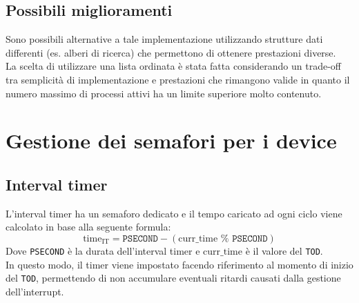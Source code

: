 \documentclass[11pt]{article}
\begin{document}
\subsection{Possibili miglioramenti}
Sono possibili alternative a tale implementazione utilizzando strutture dati differenti (es. alberi di ricerca) che permettono di ottenere prestazioni diverse. \\
La scelta di utilizzare una lista ordinata è stata fatta considerando un trade-off tra semplicità di implementazione e prestazioni che rimangono valide in quanto il numero massimo di processi attivi ha un limite superiore molto contenuto.

\newpage
\section{Gestione dei semafori per i device}
\subsection{Interval timer}
L'interval timer ha un semaforo dedicato e il tempo caricato ad ogni ciclo viene calcolato in base alla seguente formula:
\begin{equation}
    \text{time}_{\text{IT}} = \texttt{PSECOND} - (\text{curr}\_\text{time } \% \texttt{ PSECOND})
\end{equation}
Dove \texttt{PSECOND} è la durata dell'interval timer e $\text{curr}\_\text{time}$ è il valore del \texttt{TOD}.\\
In questo modo, il timer viene impostato facendo riferimento al momento di inizio del \texttt{TOD}, permettendo di non accumulare eventuali ritardi causati dalla gestione dell'interrupt.
\end{document}
